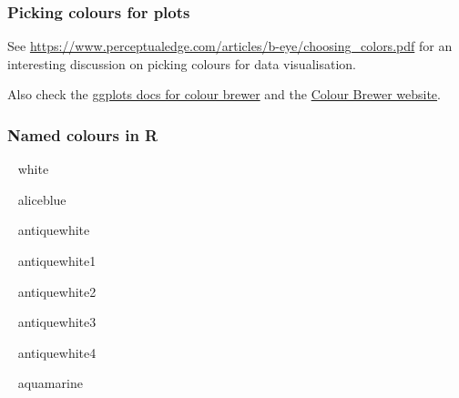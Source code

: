 \documentclass[]{article}
\newenvironment{Shaded}{\begin{snugshade}}{\end{snugshade}}
\newcommand{\CharTok}[1]{\textcolor[rgb]{0.31,0.60,0.02}{#1}}
\newcommand{\ControlFlowTok}[1]{\textcolor[rgb]{0.13,0.29,0.53}{\textbf{#1}}}
\newcommand{\DecValTok}[1]{\textcolor[rgb]{0.00,0.00,0.81}{#1}}
\newcommand{\KeywordTok}[1]{\textcolor[rgb]{0.13,0.29,0.53}{\textbf{#1}}}
\newcommand{\NormalTok}[1]{#1}
\newcommand{\OperatorTok}[1]{\textcolor[rgb]{0.81,0.36,0.00}{\textbf{#1}}}
\newcommand{\StringTok}[1]{\textcolor[rgb]{0.31,0.60,0.02}{#1}}
\begin{document}
\hypertarget{picking-colours}{%
\subsubsection*{Picking colours for plots}\label{picking-colours}}

See \url{https://www.perceptualedge.com/articles/b-eye/choosing_colors.pdf} for an
interesting discussion on picking colours for data visualisation.

Also check the
\href{http://ggplot2.tidyverse.org/reference/scale_brewer.html}{ggplots docs for colour brewer}
and the \href{http://colorbrewer2.org/}{Colour Brewer website}.

\hypertarget{named-colours}{%
\subsubsection*{Named colours in R}\label{named-colours}}

\begin{Shaded}
\end{Shaded}

{~} white

{~} aliceblue

{~} antiquewhite

{~} antiquewhite1

{~} antiquewhite2

{~} antiquewhite3

{~} antiquewhite4

{~} aquamarine
\end{document}

